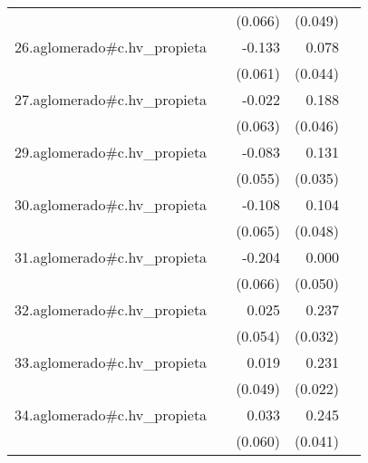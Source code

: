 {\begin{longtable}{l*{4}{D{.}{.}{-1}}}
            &                     &     (0.066)         &     (0.049)         &                     \\
\addlinespace
26.aglomerado#c.hv\_propieta&                     &      -0.133\sym{*}  &       0.078         &                     \\
            &                     &     (0.061)         &     (0.044)         &                     \\
\addlinespace
27.aglomerado#c.hv\_propieta&                     &      -0.022         &       0.188\sym{***}&                     \\
            &                     &     (0.063)         &     (0.046)         &                     \\
\addlinespace
29.aglomerado#c.hv\_propieta&                     &      -0.083         &       0.131\sym{***}&                     \\
            &                     &     (0.055)         &     (0.035)         &                     \\
\addlinespace
30.aglomerado#c.hv\_propieta&                     &      -0.108         &       0.104\sym{*}  &                     \\
            &                     &     (0.065)         &     (0.048)         &                     \\
\addlinespace
31.aglomerado#c.hv\_propieta&                     &      -0.204\sym{**} &       0.000         &                     \\
            &                     &     (0.066)         &     (0.050)         &                     \\
\addlinespace
32.aglomerado#c.hv\_propieta&                     &       0.025         &       0.237\sym{***}&                     \\
            &                     &     (0.054)         &     (0.032)         &                     \\
\addlinespace
33.aglomerado#c.hv\_propieta&                     &       0.019         &       0.231\sym{***}&                     \\
            &                     &     (0.049)         &     (0.022)         &                     \\
\addlinespace
34.aglomerado#c.hv\_propieta&                     &       0.033         &       0.245\sym{***}&                     \\
            &                     &     (0.060)         &     (0.041)         &                     \\

\end{longtable}}

